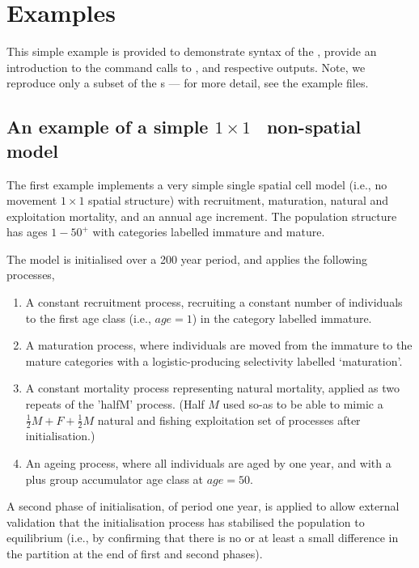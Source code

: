 
\section{Examples\label{sec:examples}}

This simple example is provided to demonstrate syntax of the \config, provide an introduction to the command calls to \SPM, and respective outputs. Note, we reproduce only a subset of the \config s --- for more detail, see the example files. 

\subsection{An example of a simple
  \texorpdfstring{$ 1 \times 1 $}{%
    1 x 1
  }%
\ non-spatial model\label{example1}} 

The first example implements a very simple single spatial cell model (i.e., no movement $1 \times 1$ spatial structure) with recruitment, maturation, natural and exploitation mortality, and an annual age increment. The population structure has ages $1-50^{+}$ with categories labelled immature and mature. 

The model is initialised over a 200 year period, and applies the following processes,

\begin{enumerate}
\item A constant recruitment process, recruiting a constant number of individuals to the first age class (i.e., $age=1$) in the category labelled immature.
\item A maturation process, where individuals are moved from the immature to the mature categories with a logistic-producing selectivity labelled `maturation'.
\item A constant mortality process representing natural mortality, applied as two repeats of the 'halfM' process. (Half $M$ used so-as to be able to mimic a $\frac{1}{2} M + F + \frac{1}{2} M$ natural and fishing exploitation set of processes after initialisation.)
\item An ageing process, where all individuals are aged by one year, and with a plus group accumulator age class at $age=50$.
\end{enumerate}

A second phase of initialisation, of period one year, is applied to allow external validation that the initialisation process has stabilised the population to equilibrium (i.e., by confirming that there is no or at least a small difference in the partition at the end of first and second phases).


